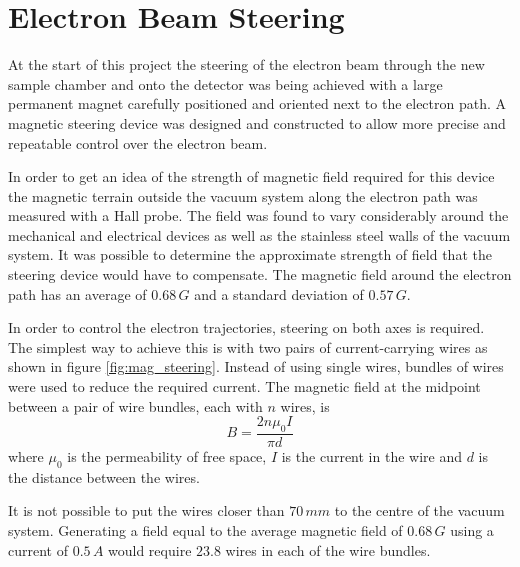 \section{Electron Beam Steering}
At the start of this project the steering of the electron beam through the new sample chamber and onto the detector was being achieved with a large permanent magnet carefully positioned and oriented next to the electron path. A magnetic steering device was designed and constructed to allow more precise and repeatable control over the electron beam.

In order to get an idea of the strength of magnetic field required for this device the magnetic terrain outside the vacuum system along the electron path was measured with a Hall probe. The field was found to vary considerably around the mechanical and electrical devices as well as the stainless steel walls of the vacuum system. It was possible to determine the approximate strength of field that the steering device would have to compensate. The magnetic field around the electron path has an average of $0.68\,\unit{G}$ and a standard deviation of $0.57\,\unit{G}$.

In order to control the electron trajectories, steering on both axes is required. The simplest way to achieve this is with two pairs of current-carrying wires as shown in figure \ref{fig:mag_steering}. Instead of using single wires, bundles of wires were used to reduce the required current. The magnetic field at the midpoint between a pair of wire bundles, each with $n$ wires, is
\begin{equation}
B=\frac{2n\mu_0I}{\pi d}
\end{equation}
where $\mu_0$ is the permeability of free space, $I$ is the current in the wire and $d$ is the distance between the wires.

It is not possible to put the wires closer than $70\,\unit{mm}$ to the centre of the vacuum system. Generating a field equal to the average magnetic field of $0.68\,\unit{G}$ using a current of $0.5\,\unit{A}$ would require $23.8$ wires in each of the wire bundles.

